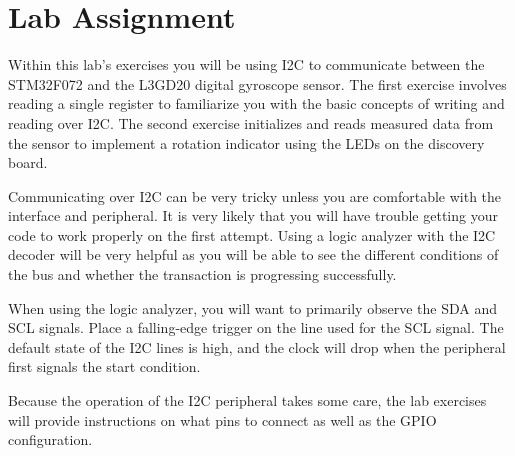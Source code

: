 \documentclass[openany,11pt,fleqn]{book} %
\begin{document}
\section{\color{blue}Lab Assignment}
Within this lab's exercises you will be using I2C to communicate between the STM32F072 and the L3GD20 digital gyroscope sensor. The first exercise involves reading a single register to familiarize you with the basic concepts of writing and reading over I2C. The second exercise initializes and reads measured data from the sensor to  implement a rotation indicator using the LEDs on the discovery board. 

Communicating over I2C can be very tricky unless you are comfortable with the interface and peripheral. It is very likely that you will have trouble getting your code to work properly on the first attempt. Using a logic analyzer with the I2C decoder will be very helpful as you will be able to see the different conditions of the bus and whether the transaction is progressing successfully. 

When using the logic analyzer, you will want to primarily observe the SDA and SCL signals. Place a falling-edge trigger on the line used for the SCL signal. The default state of the I2C lines is high, and the clock will drop when the peripheral first signals the start condition.  

Because the operation of the I2C peripheral takes some care, the lab exercises will provide instructions on what pins to connect as well as the GPIO configuration. 
\end{document}
